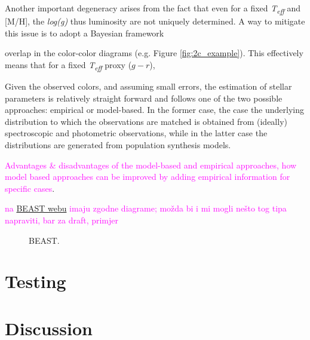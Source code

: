 \documentclass[linenumbers, twocolumn, trackchanges]{aastex631}
\newcommand{\magcom}[1]{\textcolor{magenta}{#1}} %
\newcommand{\mh}{[M/H]\xspace}
\newcommand{\logg}{\textit{log(g)}\xspace}
\newcommand{\teff}{\textit{T\textsubscript{eff}}\xspace}
\begin{document}
Another important degeneracy arises from the fact that even for a fixed \teff and \mh, the \logg thus luminosity are not uniquely determined. A way to mitigate this issue is to adopt a Bayesian framework 


overlap in the color-color diagrams (e.g. Figure \ref{fig:2c_example}). This effectively means that for a fixed \teff proxy ($g-r$), 

Given the observed colors, and assuming small errors, the estimation of stellar parameters is relatively straight forward and follows one of the two possible approaches: empirical or model-based. In the former case, the case the underlying distribution to which the observations are matched is obtained from (ideally) spectroscopic and photometric observations, while in the latter case the distributions are generated from population synthesis models.

\magcom{Advantages \& disadvantages of the model-based and empirical approaches, how model based approaches can be improved by adding empirical information for specific cases}.

\magcom{\cite{gordon_panchromatic_2016} na \href{https://beast.readthedocs.io/en/latest/beast\_graphical\_model.html}{BEAST webu} imaju zgodne diagrame; možda bi i mi mogli nešto tog tipa napraviti, bar za draft, primjer }

\begin{figure}[ht!]
	\caption{BEAST. \label{fig:BEAST}}
\end{figure}



\section{Testing}


\section{Discussion}

\end{document}
